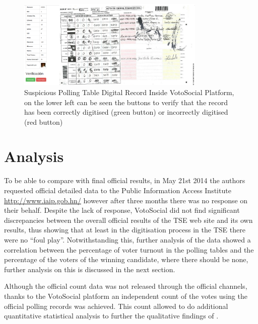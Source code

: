 \documentclass[letterpaper,10pt]{article}
\begin{document}
\begin{figure}[h!]
    \centering
    \includegraphics[width=0.8\textwidth]{images/vs-valid-strange}
    \caption{Suspicious Polling Table Digital Record Inside VotoSocial Platform, on the lower left can be seen the buttons to verify that the record has been correctly digitised (green button) or incorrectly digitised (red button)}
    \label{fig:strange}
\end{figure}





\section{Analysis}

To be able to compare with final official results, in May 21st 2014 the authors requested official detailed data to the Public Information Access Institute \url{http://www.iaip.gob.hn/} however after three months there was no response on their behalf. Despite the lack of response, VotoSocial did not find significant discrepancies between the overall official results of the TSE web site and its own results, thus showing that at least in the digitisation process in the TSE there were no ``foul play''. Notwithstanding this, further analysis of the data showed a correlation between the percentage of voter turnout in the polling tables and the percentage of the voters of the winning candidate, where there should be none, further analysis on this is discussed in the next section.

Although the official count data was not released through the official channels, thanks to the VotoSocial platform an independent count of the votes using the official polling records was achieved. This count allowed to do additional quantitative statistical analysis to further the qualitative findings of \cite{gonza2014}.
\end{document}
